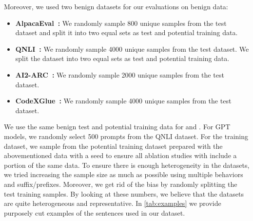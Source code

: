 Moreover, we used two benign datasets for our evaluations on benign data:
\begin{itemize}
    \item \textbf{AlpacaEval~\citep{dubois2024alpacafarm}:} We randomly sample 800 unique samples from the test dataset and split it into two equal sets as test and potential training data.
    \item \textbf{QNLI~\citep{wang-etal-2018-glue}:} We randomly sample 4000 unique samples from the test dataset. We split the dataset into two equal sets as test and potential training data. 
    \item \textbf{AI2-ARC~\citep{Yadav_2019}:} We randomly sample 2000 unique samples from the test dataset.
    \item \textbf{CodeXGlue~\citep{codexglue}:} We randomly sample 4000 unique samples from the test dataset.
\end{itemize}
We use the same benign test and potential training data for \llama{} and \vicuna{}. For GPT models, we randomly select 500 prompts from the QNLI dataset. For the training dataset, we sample from the potential training dataset prepared with the abovementioned data with a seed to ensure all ablation studies with \methodname{} include a portion of the same data. To ensure there is enough heterogeneity in the datasets, we tried increasing the sample size as much as possible using multiple behaviors and suffix/prefixes. Moreover, we get rid of the bias by randomly splitting the test training samples. By looking at these numbers, we believe that the datasets are quite heterogeneous and representative. In \cref{tab:examples} we provide purposely cut examples of the sentences used in our dataset. 

